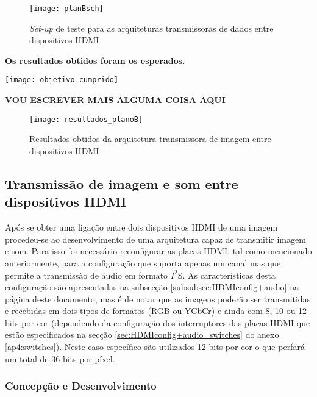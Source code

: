 \begin{figure}[h!]
	\begin{center}
		\leavevmode
		\texttt{[image: planBsch]}
		\caption{\textit{Set-up} de teste para as arquiteturas transmissoras de dados entre dispositivos HDMI}
		\label{fig:planb_sch}
	\end{center}
\end{figure}

\textbf{Os resultados obtidos foram os esperados.}
\begin{marginfigure}
	\hspace*{0.75in}
	\texttt{[image: objetivo\_cumprido]}
\end{marginfigure}
\textbf{VOU ESCREVER MAIS ALGUMA COISA AQUI}


\begin{figure}[h!]
	\begin{center}
		\leavevmode
		\texttt{[image: resultados\_planoB]}
		\caption{Resultados obtidos da arquitetura transmissora de imagem entre dispositivos HDMI}
		\label{fig:resultados_planoB}
	\end{center}
\end{figure}
\subsection{Transmissão de imagem e som entre dispositivos HDMI}

Após se obter uma ligação entre dois dispositivos HDMI de uma imagem procedeu-se ao desenvolvimento de uma arquitetura capaz de transmitir imagem e som. Para isso foi necessário reconfigurar as placas HDMI, tal como mencionado anteriormente, para a configuração que suporta apenas um canal mas que permite a transmissão de áudio em formato $I^{2}$S. As características desta configuração são apresentadas na subsecção \ref{subsubsec:HDMIconfig+audio} na página \pageref{subsubsec:HDMIconfig+audio} deste documento, mas é de notar que as imagens poderão ser transmitidas e recebidas em dois tipos de formatos (RGB ou YCbCr) e ainda com 8, 10 ou 12 bits por cor (dependendo da configuração dos interruptores das placas HDMI que estão especificados na secção \ref{sec:HDMIconfig+audio_switches} do anexo \ref{ap4:switches}). Neste caso específico são utilizados 12 bits por cor o que perfará um total de 36 bits por píxel.

\subsubsection*{Concepção e Desenvolvimento}

